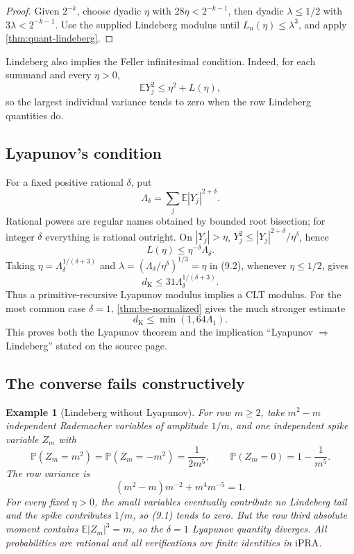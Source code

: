 \documentclass[11pt]{article}
\newtheorem{example}[theorem]{Example}
\newcommand{\E}{\mathbb E}
\newcommand{\Pp}{\mathbb P}
\newcommand{\dk}{d_{\mathrm K}}
\newcommand{\ipra}{\mathrm{iPRA}}
\begin{document}
\begin{proof}
Given \(2^{-k}\), choose dyadic \(\eta\) with \(28\eta<2^{-k-1}\), then
dyadic \(\lambda\le1/2\) with \(3\lambda<2^{-k-1}\).  Use the supplied
Lindeberg modulus until \(L_n(\eta)\le\lambda^3\), and apply
\cref{thm:quant-lindeberg}.
\end{proof}

Lindeberg also implies the Feller infinitesimal condition.  Indeed, for each
summand and every \(\eta>0\),
\[
 \E Y_j^2\le\eta^2+L(\eta),                           \tag{9.7}
\]
so the largest individual variance tends to zero when the row Lindeberg
quantities do.

\subsection{Lyapunov's condition}

For a fixed positive rational \(\delta\), put
\[
 \Lambda_\delta=\sum_j\E|Y_j|^{2+\delta}.             \tag{9.8}
\]
Rational powers are regular names obtained by bounded root bisection; for
integer \(\delta\) everything is rational outright.  On \(|Y_j|>\eta\),
\(Y_j^2\le |Y_j|^{2+\delta}/\eta^\delta\), hence
\[
 L(\eta)\le\eta^{-\delta}\Lambda_\delta.             \tag{9.9}
\]
Taking
\(\eta=\Lambda_\delta^{1/(\delta+3)}\) and
\(\lambda=(\Lambda_\delta/\eta^\delta)^{1/3}=\eta\)
in (9.2), whenever \(\eta\le1/2\), gives
\[
 \dk\le31\Lambda_\delta^{1/(\delta+3)}.             \tag{9.10}
\]
Thus a primitive-recursive Lyapunov modulus implies a CLT modulus.  For the
most common case \(\delta=1\), \cref{thm:be-normalized} gives the much
stronger estimate
\[
 \dk\le\min(1,64\Lambda_1).                           \tag{9.11}
\]
This proves both the Lyapunov theorem and the implication
``Lyapunov \(\Rightarrow\) Lindeberg'' stated on the source page.

\subsection{The converse fails constructively}

\begin{example}[Lindeberg without Lyapunov]\label{ex:nonconverse}
For row \(m\ge2\), take \(m^2-m\) independent Rademacher variables of
amplitude \(1/m\), and one independent spike variable \(Z_m\) with
\[
 \Pp(Z_m=m^2)=\Pp(Z_m=-m^2)=\frac1{2m^5},
 \qquad \Pp(Z_m=0)=1-\frac1{m^5}.                    \tag{9.12}
\]
The row variance is
\[
 (m^2-m)m^{-2}+m^4m^{-5}=1.                           \tag{9.13}
\]
For every fixed \(\eta>0\), the small variables eventually contribute no
Lindeberg tail and the spike contributes \(1/m\), so (9.1) tends to zero.
But the row third absolute moment contains
\(\E|Z_m|^3=m\), so the \(\delta=1\) Lyapunov quantity diverges.  All
probabilities are rational and all verifications are finite identities in
\(\ipra\).
\end{example}
\end{document}
